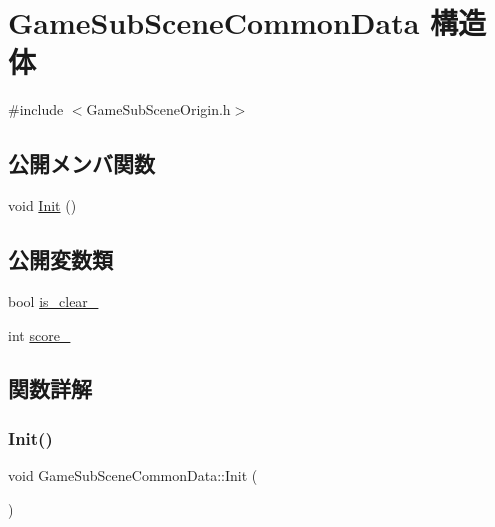 \hypertarget{struct_game_sub_scene_common_data}{}\section{Game\+Sub\+Scene\+Common\+Data 構造体}
\label{struct_game_sub_scene_common_data}


{\ttfamily \#include $<$Game\+Sub\+Scene\+Origin.\+h$>$}

\subsection*{公開メンバ関数}
\begin{DoxyCompactItemize}
\item 
void \mbox{\hyperlink{struct_game_sub_scene_common_data_a7fd7331f8411b19fcb8fef6b095c8d17}{Init}} ()
\end{DoxyCompactItemize}
\subsection*{公開変数類}
\begin{DoxyCompactItemize}
\item 
bool \mbox{\hyperlink{struct_game_sub_scene_common_data_ae31672bcfc386791edbce84c7206630b}{is\+\_\+clear\+\_\+}}
\item 
int \mbox{\hyperlink{struct_game_sub_scene_common_data_ad51bf5d0ff7cff0ff079382e16e05fb7}{score\+\_\+}}
\end{DoxyCompactItemize}


\subsection{関数詳解}
\mbox{\label{struct_game_sub_scene_common_data_a7fd7331f8411b19fcb8fef6b095c8d17}} 
\subsubsection{\texorpdfstring{Init()}{Init()}}
{\footnotesize\ttfamily void Game\+Sub\+Scene\+Common\+Data\+::\+Init (\begin{DoxyParamCaption}{ }\end{DoxyParamCaption})\hspace{0.3cm}{\ttfamily [inline]}}



